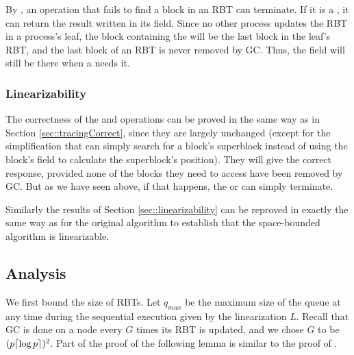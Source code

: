 By , an operation that fails to find a block in an RBT can terminate.
If it is a , it can return the result written in its  field.
Since no other process updates the RBT in a process's leaf, the block containing the 
will be the last block in the leaf's RBT, and the last block of an RBT is never removed by GC.
Thus, the  field will still be there when a  needs it.

\subsubsection{Linearizability}

The correctness of the  and   operations
can be proved in the same way as in Section \ref{sec::tracingCorrect},
since they are largely unchanged (except for the simplification that 
can simply search for a block's superblock instead of using the block's  
field to calculate the superblock's position).
They will give the correct response, provided none of the blocks they need to access have been 
removed by GC.  But as we have seen above, if that happens, the  or  can simply terminate.

Similarly the results of Section \ref{sec::linearizability} 
can be reproved in exactly the same way as for the original algorithm to establish
that the space-bounded algorithm is linearizable.

\subsection{Analysis}
\label{sec::GCanalysis}


We first bound the size of RBTs.  Let $q_{max}$ be the maximum size of the queue at any time during the sequential execution given by the linearization $L$.
Recall that GC is done on a node every $G$ times its RBT is updated, and we chose $G$ to be $(p\lceil \log p \rceil)^2$.
Part of the proof of the following lemma is similar to the proof of .


